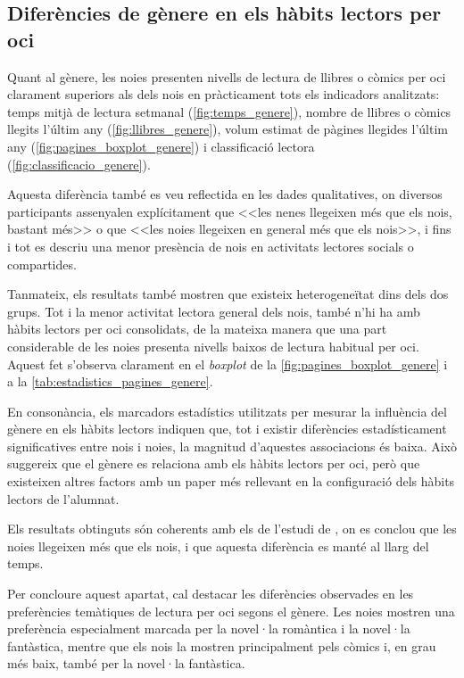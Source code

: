 \documentclass[12pt]{article}
\begin{document}
\subsection{Diferències de gènere en els hàbits lectors per oci}
Quant al gènere, les noies presenten nivells de lectura de llibres o còmics per oci clarament superiors als dels nois en pràcticament tots els indicadors analitzats: temps mitjà de lectura setmanal (\autoref{fig:temps_genere}), nombre de llibres o còmics llegits l'últim any (\autoref{fig:llibres_genere}), volum estimat de pàgines llegides l'últim any (\autoref{fig:pagines_boxplot_genere}) i classificació lectora (\autoref{fig:classificacio_genere}).

Aquesta diferència també es veu reflectida en les dades qualitatives, on diversos participants assenyalen explícitament que <<les nenes llegeixen més que els nois, bastant més>> o que <<les noies llegeixen en general més que els nois>>, i fins i tot es descriu una menor presència de nois en activitats lectores socials o compartides.

Tanmateix, els resultats també mostren que existeix heterogeneïtat dins dels dos grups. Tot i la menor activitat lectora general dels nois, també n'hi ha amb hàbits lectors per oci consolidats, de la mateixa manera que una part considerable de les noies presenta nivells baixos de lectura habitual per oci. Aquest fet s'observa clarament en el \emph{boxplot} de la \autoref{fig:pagines_boxplot_genere} i a la \autoref{tab:estadistics_pagines_genere}.

En consonància, els marcadors estadístics utilitzats per mesurar la influència del gènere en els hàbits lectors indiquen que, tot i existir diferències estadísticament significatives entre nois i noies, la magnitud d’aquestes associacions és baixa. Això suggereix que el gènere es relaciona amb els hàbits lectors per oci, però que existeixen altres factors amb un paper més rellevant en la configuració dels hàbits lectors de l’alumnat.  

Els resultats obtinguts són coherents amb els de l'estudi de \textcite{johnsson_bookreading}, on es conclou que les noies llegeixen més que els nois, i que aquesta diferència es manté al llarg del temps. 

Per concloure aquest apartat, cal destacar les diferències observades en les preferències temàtiques de lectura per oci segons el gènere. Les noies mostren una preferència especialment marcada per la novel·la romàntica i la novel·la fantàstica, mentre que els nois la mostren principalment pels còmics i, en grau més baix, també per la novel·la fantàstica.
\end{document}
